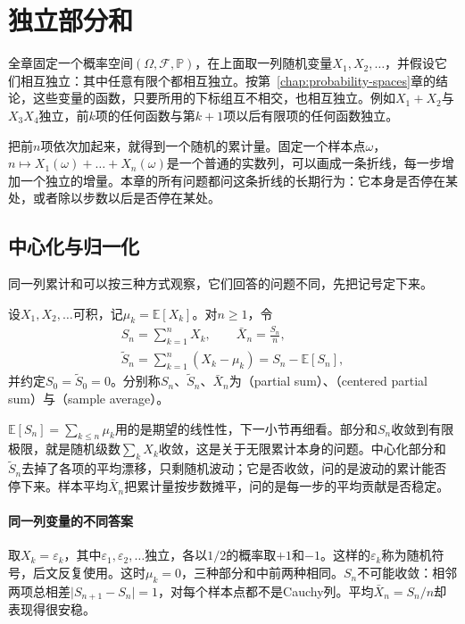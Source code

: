 \section{独立部分和}
\label{sec:lln-partial-sums}

全章固定一个概率空间$(\Omega,\mathcal{F},\mathbb{P})$，在上面取一列随机变量$X_1,X_2,\dots$，并假设它们相互独立：其中任意有限个都相互独立。按第~\ref{chap:probability-spaces}章的结论，这些变量的函数，只要所用的下标组互不相交，也相互独立。例如$X_1+X_2$与$X_3X_4$独立，前$k$项的任何函数与第$k+1$项以后有限项的任何函数独立。

把前$n$项依次加起来，就得到一个随机的累计量。固定一个样本点$\omega$，$n\mapsto X_1(\omega)+\dots+X_n(\omega)$是一个普通的实数列，可以画成一条折线，每一步增加一个独立的增量。本章的所有问题都问这条折线的长期行为：它本身是否停在某处，或者除以步数以后是否停在某处。

\subsection{中心化与归一化}
\label{sec:lln-normalization}

同一列累计和可以按三种方式观察，它们回答的问题不同，先把记号定下来。

\begin{definition}
\label{def:lln-partial-sums}
设$X_1,X_2,\dots$可积，记$\mu_k=\mathbb{E}[X_k]$。对$n\geq1$，令
\begin{equation}
 \begin{gathered}
 S_n=\sum_{k=1}^{n}X_k,\qquad \bar{X}_n=\frac{S_n}{n},\\
 \tilde{S}_n=\sum_{k=1}^{n}(X_k-\mu_k)=S_n-\mathbb{E}[S_n],
 \end{gathered}
 \label{eq:lln-partial-sums}
\end{equation}
并约定$S_0=\tilde{S}_0=0$。分别称$S_n$、$\tilde{S}_n$、$\bar{X}_n$为（partial sum）、（centered partial sum）与（sample average）。
\end{definition}

$\mathbb{E}[S_n]=\sum_{k\leq n}\mu_k$用的是期望的线性性，下一小节再细看。部分和$S_n$收敛到有限极限，就是随机级数$\sum_kX_k$收敛，这是关于无限累计本身的问题。中心化部分和$\tilde{S}_n$去掉了各项的平均漂移，只剩随机波动；它是否收敛，问的是波动的累计能否停下来。样本平均$\bar{X}_n$把累计量按步数摊平，问的是每一步的平均贡献是否稳定。

\paragraph{同一列变量的不同答案}
取$X_k=\varepsilon_k$，其中$\varepsilon_1,\varepsilon_2,\dots$独立，各以$1/2$的概率取$+1$和$-1$。这样的$\varepsilon_k$称为随机符号，后文反复使用。这时$\mu_k=0$，三种部分和中前两种相同。$S_n$不可能收敛：相邻两项总相差$\lvert S_{n+1}-S_n\rvert=1$，对每个样本点都不是Cauchy列。平均$\bar{X}_n=S_n/n$却表现得很安稳。

